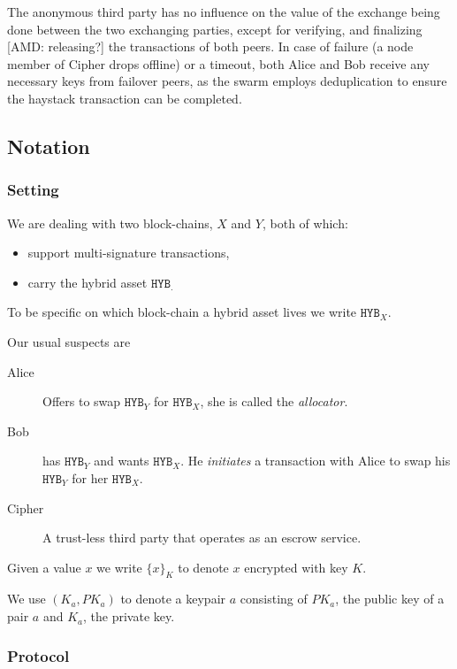 \documentclass[a4paper,fullpack]{article}
\newcommand{\hyb}[1]{\ensuremath{\mathtt{ HYB }_{#1}}}
\newcommand{\crypt}[1]{\ensuremath{ {\lbrace {#1} \rbrace} } }
\begin{document}
The anonymous third party has no influence on the value of the exchange being done between the two exchanging parties, except for verifying, and finalizing [AMD: releasing?] the transactions of both peers. In case of failure (a node member of Cipher drops offline) or a timeout, both Alice and Bob receive any necessary keys from failover peers, as the swarm employs deduplication to ensure the haystack transaction can be completed.

\subsection{Notation}

\subsubsection{Setting}

We are dealing with two block-chains, $X$ and $Y$, both of which:

\begin{itemize}
\item support multi-signature transactions,
\item carry the hybrid asset \hyb.
\end{itemize}

To be specific on which block-chain a hybrid asset lives we write \hyb{X}.

Our usual suspects are

\begin{description}
	\item[Alice] Offers to swap \hyb{Y} for \hyb{X}, she is called the \emph{allocator}.
	
	\item[Bob] has \hyb{Y} and wants \hyb{X}. He \emph{initiates} a transaction with Alice to swap his \hyb{Y} for her \hyb{X}.
	
	\item[Cipher] A trust-less third party that operates as an escrow service.
\end{description}

Given a value $x$ we write $\crypt{x}_K$ to denote $x$ encrypted with key $K$.

We use $(K_a, PK_a)$ to denote a keypair $a$ consisting of
$PK_a$, the public key of a pair $a$ and $K_a$, the private key.

\subsubsection{Protocol}
\end{document}
